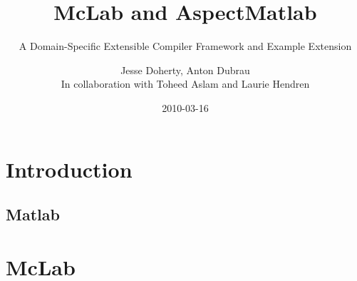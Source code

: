 \documentclass{beamer}
\begin{document}
\title{McLab and AspectMatlab}
\subtitle{\small{A Domain-Specific Extensible Compiler Framework and
    Example Extension}}

\author{Jesse Doherty, Anton Dubrau\\In collaboration with Toheed
  Aslam and Laurie Hendren} 
\date{2010-03-16} 


\small
{}

\frame{\titlepage} 




\section{Introduction} %

\subsection{Matlab} %

\section{McLab} %

\end{document}
